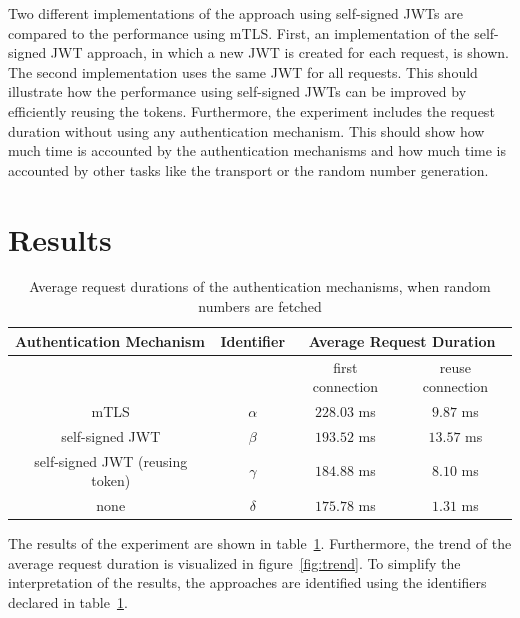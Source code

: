 Two different implementations of the approach using self-signed JWTs are compared to the performance using mTLS.
First, an implementation of the self-signed JWT approach, in which a new JWT is created for each request, is shown.
The second implementation uses the same JWT for all requests.
This should illustrate how the performance using self-signed JWTs can be improved by efficiently reusing the tokens.
Furthermore, the experiment includes the request duration without using any authentication mechanism.
This should show how much time is accounted by the authentication mechanisms and how much time is accounted by other tasks like the transport or the random number generation.

\section{Results}

\begin{table}[H]
	\centering
\begin{tabular}{c|c|cc}
	\multicolumn{1}{l|}{\textbf{Authentication Mechanism}} & \textbf{Identifier} & \multicolumn{2}{c}{\textbf{Average Request Duration}} \\ \hline
	\multicolumn{1}{c|}{} & & \multicolumn{1}{c|}{first connection} & reuse connection \\ \hline
	mTLS & $\alpha$ & \multicolumn{1}{c|}{$228.03$ ms} & $9.87$ ms \\ \hline
	self-signed JWT & $\beta$ & \multicolumn{1}{c|}{$193.52$ ms} & $13.57$ ms \\ \hline
	self-signed JWT (reusing token) & $\gamma$ & \multicolumn{1}{c|}{$184.88$ ms} & $8.10$ ms \\ \hline 
	none & $\delta$ & \multicolumn{1}{c|}{$175.78$ ms} & $1.31$ ms
\end{tabular}
\caption{Average request durations of the authentication mechanisms, when random numbers are fetched}
\label{tab:experiment_case_1}
\end{table}

The results of the experiment are shown in table~\ref{tab:experiment_case_1}.
Furthermore, the trend of the average request duration is visualized in figure~\ref{fig:trend}.
To simplify the interpretation of the results, the approaches are identified using the identifiers declared in table~\ref{tab:experiment_case_1}.

